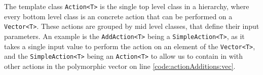 The template class \texttt{Action<T>} is the single top level class in a hierarchy, where every bottom level class is an concrete action that can be performed on a \texttt{Vector<T>}. These actions are grouped by mid level classes, that define their input parameters. An example is the \texttt{AddAction<T>} being a \texttt{SimpleAction<T>}, as it takes a single input value to perform the action on an element of the \texttt{Vector<T>}, and the \texttt{SimpleAction<T>} being an \texttt{Action<T>} to allow us to contain in with other actions in the polymorphic vector on line \ref{code:actionAdditions:vec}.

